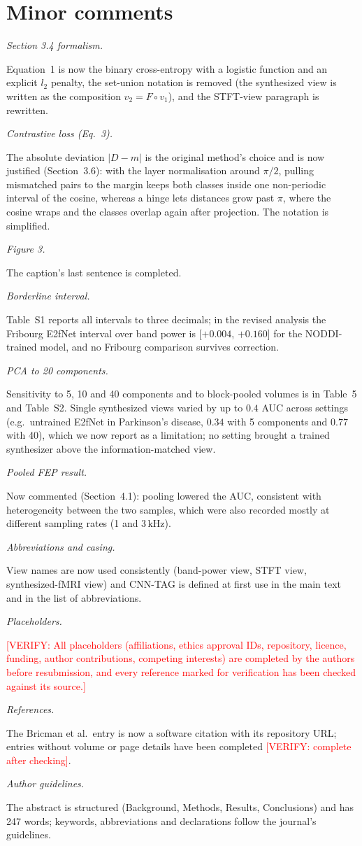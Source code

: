 \documentclass[11pt]{article}
\newcommand{\verify}[1]{\textcolor{red}{[VERIFY: #1]}}
\newcommand{\rc}[1]{\par\medskip\noindent\textit{#1}\par\smallskip}
\begin{document}
\section*{Minor comments}

\rc{Section 3.4 formalism.} Equation~1 is now the binary cross-entropy with a logistic function and an explicit $l_2$ penalty, the set-union notation is removed (the synthesized view is written as the composition $v_2 = F\circ v_1$), and the STFT-view paragraph is rewritten.

\rc{Contrastive loss (Eq.~3).} The absolute deviation $|D-m|$ is the original method's choice and is now justified (Section~3.6): with the layer normalisation around $\pi/2$, pulling mismatched pairs to the margin keeps both classes inside one non-periodic interval of the cosine, whereas a hinge lets distances grow past $\pi$, where the cosine wraps and the classes overlap again after projection. The notation is simplified.

\rc{Figure 3.} The caption's last sentence is completed.

\rc{Borderline interval.} Table~S1 reports all intervals to three decimals; in the revised analysis the Fribourg E2fNet interval over band power is [$+0.004$, $+0.160$] for the NODDI-trained model, and no Fribourg comparison survives correction.

\rc{PCA to 20 components.} Sensitivity to 5, 10 and 40 components and to block-pooled volumes is in Table~5 and Table~S2. Single synthesized views varied by up to $0.4$ AUC across settings (e.g.\ untrained E2fNet in Parkinson's disease, $0.34$ with 5 components and $0.77$ with 40), which we now report as a limitation; no setting brought a trained synthesizer above the information-matched view.

\rc{Pooled FEP result.} Now commented (Section~4.1): pooling lowered the AUC, consistent with heterogeneity between the two samples, which were also recorded mostly at different sampling rates (1 and 3\,kHz).

\rc{Abbreviations and casing.} View names are now used consistently (band-power view, STFT view, synthesized-fMRI view) and CNN-TAG is defined at first use in the main text and in the list of abbreviations.

\rc{Placeholders.} \verify{All placeholders (affiliations, ethics approval IDs, repository, licence, funding, author contributions, competing interests) are completed by the authors before resubmission, and every reference marked for verification has been checked against its source.}

\rc{References.} The Bricman et al.\ entry is now a software citation with its repository URL; entries without volume or page details have been completed \verify{complete after checking}.

\rc{Author guidelines.} The abstract is structured (Background, Methods, Results, Conclusions) and has 247 words; keywords, abbreviations and declarations follow the journal's guidelines.
\end{document}
